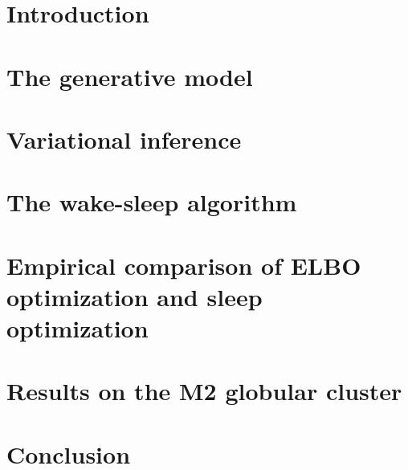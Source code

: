 \documentclass[12pt]{article}
\begin{document}
\vfill
\newpage


\section{Introduction}
\label{sec:intro}


\section{The generative model}
\label{sec:gen_model}


\section{Variational inference}
\label{sec:var_inference}


\section{The wake-sleep algorithm}
\label{sec:wake_sleep}




\section{Empirical comparison of ELBO optimization and sleep optimization}


\section{Results on the M2 globular cluster}


\section{Conclusion}
\label{sec:discussion}


\clearpage

% 



\appendix

\renewcommand\thefigure{A.\arabic{figure}}
\renewcommand\thetable{A.\arabic{table}}
\setcounter{figure}{0}    
\setcounter{table}{0}    
\end{document}
